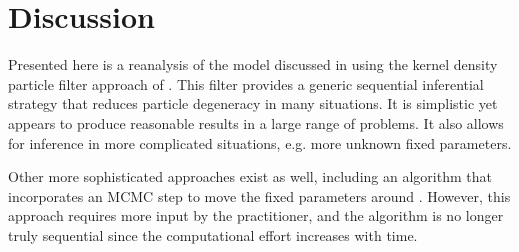 \documentclass[useAMS,referee,usenatbib]{biom}
\begin{document}
%
%

\section{Discussion \label{sec:discussion}}

Presented here is a reanalysis of the model discussed in \citet{skvortsov2012monitoring} using the kernel density particle filter approach of \citet{Liu:West:comb:2001}. This filter provides a generic sequential inferential strategy that reduces particle degeneracy in many situations. It is simplistic yet appears to produce reasonable results in a large range of problems. It also allows for inference in more complicated situations, e.g. more unknown fixed parameters.

Other more sophisticated approaches exist as well, including an algorithm that incorporates an MCMC step to move the fixed parameters around \citep{Gilk:Berz:foll:2001,Stor:part:2002}. However, this approach requires more input by the practitioner, and the algorithm is no longer truly sequential since the computational effort increases with time.

%

\end{document}
